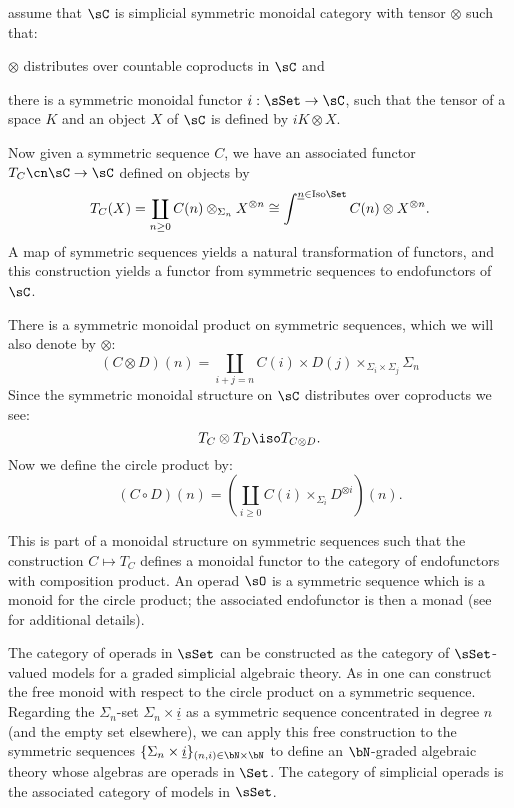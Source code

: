\documentclass[leqno,oneside,english]{elsarticle}
\begin{document}
assume that $\sC$ is simplicial symmetric monoidal category with
tensor $\otimes$ such that:
\begin{hypothenumerate}
  \item $\otimes$ distributes over countable coproducts in $\sC$ and
  \item there is a symmetric monoidal functor $i:\sSet\rightarrow \sC$,
  such that the tensor of a space $K$ and an object $X$ of $\sC$ is
  defined by $iK\otimes X$. 
\end{hypothenumerate}

Now given a symmetric sequence $C$, we have an associated functor $T_C \cn
\sC \to \sC$ defined on objects by
\begin{equation}\label{eq:monad-associated-to-operad}
  T_C(X) = \coprod_{n \ge 0} C(n) \otimes_{\Sigma_n} X^{\otimes n} \cong \int^{\underline{n}\in \mathrm{Iso}\Set} C(n)\otimes X^{\otimes n} .
\end{equation}
A map of symmetric sequences yields a natural transformation of
functors, and this construction yields a functor from
symmetric sequences to endofunctors of $\sC$. 

There is a symmetric monoidal product on symmetric sequences, which we will also 
denote by $\otimes$:
\[
(C \otimes D)(n) = \coprod_{i + j = n} C(i) \times D(j)
\times_{\Sigma_i \times \Sigma_j} \Sigma_{n}
\]
Since the symmetric monoidal structure on $\sC$ distributes over coproducts we see:
\[
  T_C \otimes T_D \iso T_{C \otimes D}.
\]
Now we define the circle product by:
\[
  (C \circ D)(n) = \left(\coprod_{i\geq 0} C(i) \times_{\Sigma_i} D^{\otimes i}\right)(n).
\]

This is part of a monoidal structure on symmetric sequences such that the construction $C \mapsto T_C$ defines a monoidal functor to the category of 
endofunctors with composition product. An operad $\sO$ is a symmetric
sequence which is a monoid for the circle product; the associated
endofunctor is then a monad (see \cite[\S~11]{Rez97} for additional details).

\begin{rmk}
  \label{rmk:operads-in-sSet-is-algebraic}
  The category of operads in $\sSet$ can be constructed as the
  category of $\sSet$-valued models for a graded simplicial algebraic theory.
  As in \cite[App.~A]{Rez96} one can construct the free monoid with
  respect to the circle product on a symmetric sequence. Regarding the
  $\Sigma_n$-set $\Sigma_n\times \underline{i}$ as a symmetric
  sequence concentrated in degree $n$ (and the empty set elsewhere),
  we can apply this free construction to the symmetric sequences
  $\{\Sigma_n \times \underline i\}_{(n,i)\in \bN\times \bN}$ to
  define an $\bN$-graded algebraic theory whose algebras are operads
  in $\Set$. The category of simplicial operads is the associated
  category of models in $\sSet$.
\end{rmk}
\end{document}
